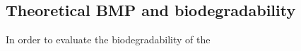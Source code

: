 \subsection{Theoretical BMP and biodegradability}
In order to evaluate the biodegradability of the 
